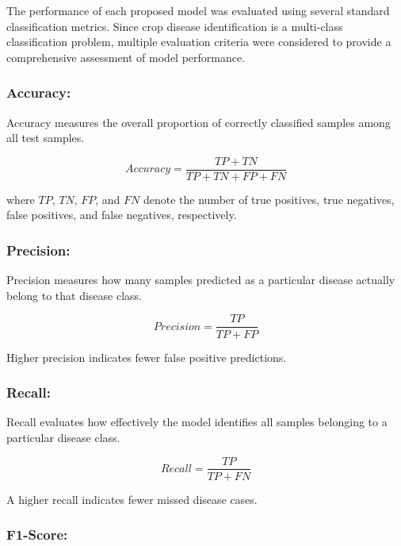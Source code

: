 The performance of each proposed model was evaluated using several standard classification metrics. Since crop disease identification is a multi-class classification problem, multiple evaluation criteria were considered to provide a comprehensive assessment of model performance.

\subsubsection{Accuracy:}

Accuracy measures the overall proportion of correctly classified samples among all test samples.

\begin{equation}
Accuracy = \frac{TP + TN}{TP + TN + FP + FN}
\end{equation}

where $TP$, $TN$, $FP$, and $FN$ denote the number of true positives, true negatives, false positives, and false negatives, respectively.

\subsubsection{Precision:}

Precision measures how many samples predicted as a particular disease actually belong to that disease class.

\begin{equation}
Precision = \frac{TP}{TP + FP}
\end{equation}

Higher precision indicates fewer false positive predictions.

\subsubsection{Recall:}

Recall evaluates how effectively the model identifies all samples belonging to a particular disease class.

\begin{equation}
Recall = \frac{TP}{TP + FN}
\end{equation}

A higher recall indicates fewer missed disease cases.

\subsubsection{F1-Score:}

